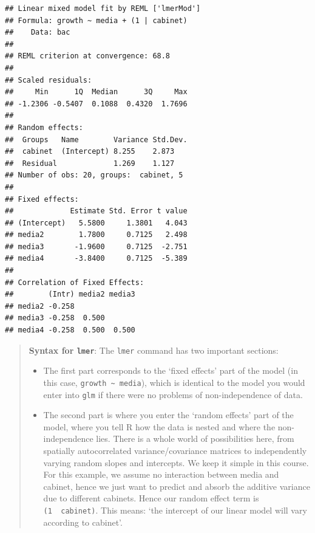 \documentclass[]{book}
\providecommand{\tightlist}{%
  \setlength{\itemsep}{0pt}\setlength{\parskip}{0pt}}
\theoremstyle{definition}
\theoremstyle{definition}
\theoremstyle{definition}
\theoremstyle{remark}
\begin{document}
\begin{verbatim}
## Linear mixed model fit by REML ['lmerMod']
## Formula: growth ~ media + (1 | cabinet)
##    Data: bac
## 
## REML criterion at convergence: 68.8
## 
## Scaled residuals: 
##     Min      1Q  Median      3Q     Max 
## -1.2306 -0.5407  0.1088  0.4320  1.7696 
## 
## Random effects:
##  Groups   Name        Variance Std.Dev.
##  cabinet  (Intercept) 8.255    2.873   
##  Residual             1.269    1.127   
## Number of obs: 20, groups:  cabinet, 5
## 
## Fixed effects:
##             Estimate Std. Error t value
## (Intercept)   5.5800     1.3801   4.043
## media2        1.7800     0.7125   2.498
## media3       -1.9600     0.7125  -2.751
## media4       -3.8400     0.7125  -5.389
## 
## Correlation of Fixed Effects:
##        (Intr) media2 media3
## media2 -0.258              
## media3 -0.258  0.500       
## media4 -0.258  0.500  0.500
\end{verbatim}

\begin{quote}
\textbf{Syntax for \texttt{lmer}}: The \texttt{lmer} command has two
important sections:

\begin{itemize}
\tightlist
\item
  The first part corresponds to the `fixed effects' part of the model
  (in this case, \texttt{growth\ \textasciitilde{}\ media}), which is
  identical to the model you would enter into \texttt{glm} if there were
  no problems of non-independence of data.
\item
  The second part is where you enter the `random effects' part of the
  model, where you tell R how the data is nested and where the
  non-independence lies. There is a whole world of possibilities here,
  from spatially autocorrelated variance/covariance matrices to
  independently varying random slopes and intercepts. We keep it simple
  in this course. For this example, we assume no interaction between
  media and cabinet, hence we just want to predict and absorb the
  additive variance due to different cabinets. Hence our random effect
  term is \texttt{(1\ \textbar{}\ cabinet)}. This means: `the intercept
  of our linear model will vary according to cabinet'.
\end{itemize}
\end{quote}
\end{document}
